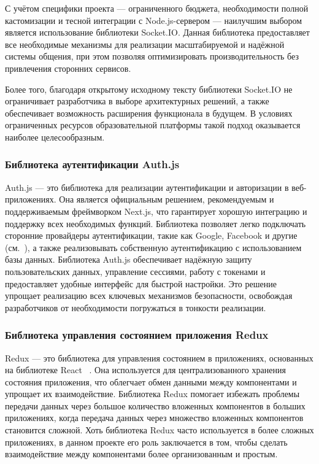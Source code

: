 С учётом специфики проекта — ограниченного бюджета, необходимости полной кастомизации и тесной интеграции с Node.js-сервером — наилучшим выбором является использование библиотеки Socket.IO. Данная библиотека предоставляет все необходимые механизмы для реализации масштабируемой и надёжной системы общения, при этом позволяя оптимизировать производительность без привлечения сторонних сервисов.

Более того, благодаря открытому исходному тексту библиотеки Socket.IO не ограничивает разработчика в выборе архитектурных решений, а также обеспечивает возможность расширения функционала в будущем. В условиях ограниченных ресурсов образовательной платформы такой подход оказывается наиболее целесообразным.

\subsubsection*{Библиотека аутентификации Auth.js}

Auth.js — это библиотека для реализации аутентификации и авторизации в веб-приложениях. Она является официальным решением, рекомендуемым и поддерживаемым фреймворком Next.js, что гарантирует хорошую интеграцию и поддержку всех необходимых функций. Библиотека позволяет легко подключать сторонние провайдеры аутентификации, такие как Google, Facebook и другие (см.~\cite{nextauth_docs}), а также реализовывать собственную аутентификацию с использованием базы данных. Библиотека Auth.js обеспечивает надёжную защиту пользовательских данных, управление сессиями, работу с токенами и предоставляет удобные интерфейс для быстрой настройки. Это решение упрощает реализацию всех ключевых механизмов безопасности, освобождая разработчиков от необходимости погружаться в тонкости реализации.  

\subsubsection*{Библиотека управления состоянием приложения Redux}

Redux — это библиотека для управления состоянием в приложениях, основанных на библиотеке React ~\cite{redux_docs}. Она используется для централизованного хранения состояния приложения, что облегчает обмен данными между компонентами и упрощает их взаимодействие. Библиотека Redux помогает избежать проблемы передачи данных через большое количество вложенных компонентов в больших приложениях, когда передача данных через множество вложенных компонентов становится сложной. Хоть библиотека Redux часто используется в более сложных приложениях, в данном проекте его роль заключается в том, чтобы сделать взаимодействие между компонентами более организованным и простым.

